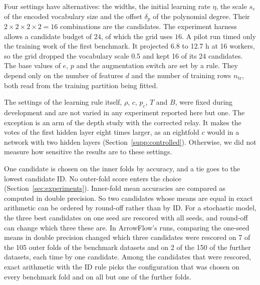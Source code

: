 Four settings have alternatives: the widths, the initial learning rate $\eta$, the scale $s_e$ of the encoded vocabulary size and the offset $\delta_p$ of the polynomial degree. Their $2\times2\times2\times2=16$ combinations are the candidates. The experiment harness allows a candidate budget of $24$, of which the grid uses $16$. A pilot run timed only the training work of the first benchmark. It projected 6.8 to 12.7 h at 16 workers, so the grid dropped the vocabulary scale 0.5 and kept 16 of its 24 candidates. The base values of $e$, $p$ and the augmentation switch are set by a rule. They depend only on the number of features $d$ and the number of training rows $n_{\mathrm{tr}}$, both read from the training partition being fitted.

The settings of the learning rule itself, $\rho$, $c$, $p_c$, $T$ and $B$, were fixed during development and are not varied in any experiment reported here but one. The exception is an arm of the depth study with the corrected relay. It makes the votes of the first hidden layer eight times larger, as an eightfold $c$ would in a network with two hidden layers (Section~\ref{supp:controlled}). Otherwise, we did not measure how sensitive the results are to these settings.

One candidate is chosen on the inner folds by accuracy, and a tie goes to the lowest candidate ID. No outer-fold score enters the choice (Section~\ref{sec:experiments}). Inner-fold mean accuracies are compared as computed in double precision. So two candidates whose means are equal in exact arithmetic can be ordered by round-off rather than by ID. For a stochastic model, the three best candidates on one seed are rescored with all seeds, and round-off can change which three these are. In ArrowFlow's runs, comparing the one-seed means in double precision changed which three candidates were rescored on 7 of the 105 outer folds of the benchmark datasets and on 2 of the 150 of the further datasets, each time by one candidate. Among the candidates that were rescored, exact arithmetic with the ID rule picks the configuration that was chosen on every benchmark fold and on all but one of the further folds.


